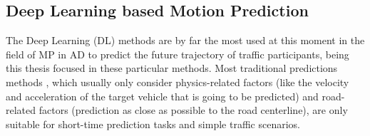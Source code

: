 \begin{comment}
\subsubsection{Deep Inverse Reinforcement Learning (DIRL)}
\label{subsubsec:2_dirl_mp}

Since the prediction problem in \ac{AD} is usually non-linear, i.e. the agent does not traverse in a straight path, it is necessary to use non-linear mapping for generalizable function approximations. In that sense, Deep Inverse Reinforcement Learning (DIRL) is proposed \cite{wulfmeier2015maximum} to approximate complex and nonlinear reward functions, which can be expressed as:

\begin{equation}
\begin{aligned}
r(\Phi(s))=f(\theta, \Phi(s))
\end{aligned}
\end{equation}

where $f$ is a nonlinear function. Some DIRL methods take historical trajectories as input. \cite{you2019advanced} consider the driving style and the road geometry, where the authors first use RL to design MDP, then learn the optimal driving policy from IRL, and use the deep neural network (DNN) to approximate the reward function. In \cite{fernando2020deep}, trajectories of traffic participants are encoded by LSTM and the reward network is learned by FCN. Currently, more DIRL-based methods directly use raw perception data. \cite{wulfmeier2017large} apply FCN for mapping the lidar data to traversability maps. The network is pre-trained to regress to a manual prior cost map and the initialize weights will be fine-tuned by the maximum entropy DIRL network. \cite{zhu2020off} use RL ConvNet and state visiting frequency (SVF) ConvNet to encode the vehicle’s kinematics and obtain the weight of the reward function by back-propagating the loss gradient \cite{wulfmeier2016watch} between expert SVF from expert demonstration and policy SVF from lidar data.
\end{comment}

\subsection{Deep Learning based Motion Prediction}
\label{sec:2_dl_based_mp}

The Deep Learning (DL) methods are by far the most used at this moment in the field of \ac{MP} in \ac{AD} to predict the future trajectory of traffic participants, being this thesis focused in these particular methods. Most traditional predictions methods \cite{huang2022survey}, which usually only consider physics-related factors (like the velocity and acceleration of the target vehicle that is going to be predicted) and road-related factors (prediction as close as possible to the road centerline), are only suitable for short-time prediction tasks \cite{huang2022survey} and simple traffic scenarios.


